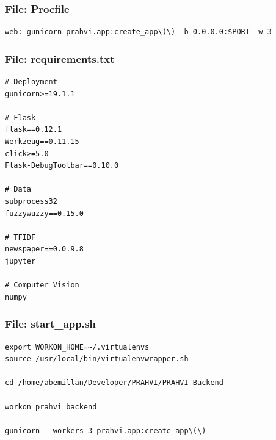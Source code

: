 \subsubsection{File: Procfile}
\begin{lstlisting}
web: gunicorn prahvi.app:create_app\(\) -b 0.0.0.0:$PORT -w 3
\end{lstlisting}

\subsubsection{File: requirements.txt}
\begin{lstlisting}
# Deployment
gunicorn>=19.1.1

# Flask
flask==0.12.1
Werkzeug==0.11.15
click>=5.0
Flask-DebugToolbar==0.10.0

# Data
subprocess32
fuzzywuzzy==0.15.0

# TFIDF
newspaper==0.0.9.8
jupyter

# Computer Vision
numpy
\end{lstlisting}

\subsubsection{File: start\_app.sh}
\begin{lstlisting}
export WORKON_HOME=~/.virtualenvs
source /usr/local/bin/virtualenvwrapper.sh

cd /home/abemillan/Developer/PRAHVI/PRAHVI-Backend

workon prahvi_backend

gunicorn --workers 3 prahvi.app:create_app\(\)
\end{lstlisting}

